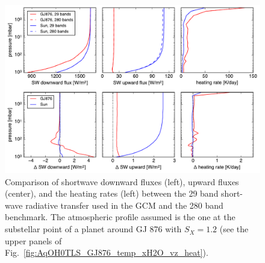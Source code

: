 \documentclass[11pt,numberedappendix,twocolappendix,]{emulateapj}
\newcommand{\dsa}[1]{{\color{blue}#1}}
\begin{document}
\begin{figure}[!htb]
    \begin{center}
    \includegraphics[width=0.8\hsize]{fig/rad_comparison_SW29-SW280_AqOH0TLS_GJ876S12P20L40Q.pdf}
    \end{center}
\caption{Comparison \dsa{of} shortwave downward \dsa{fluxes} (left), upward \dsa{fluxes} (center), and the heating \dsa{rates} (left) between \dsa{the 29 band short-wave radiative transfer used in the GCM and the 280 band benchmark}. The atmospheric profile assumed is the one at the substellar point of a planet around GJ 876 with $S_X=1.2$ (see the upper panels of Fig.~\ref{fig:AqOH0TLS_GJ876_temp_xH2O_vz_heat}). }
\label{fig:socrates}
\end{figure}
\end{document}
